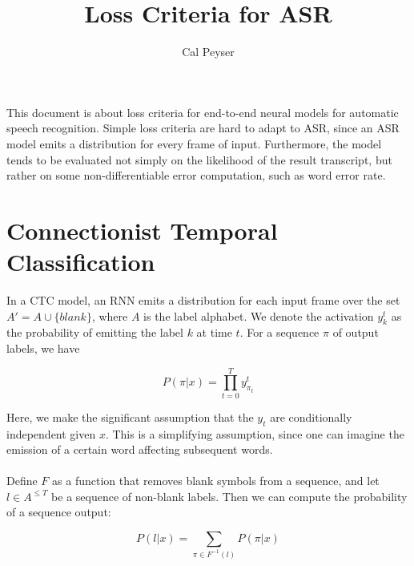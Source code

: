 \documentclass[12pt]{article}
\begin{document}
\title{Loss Criteria for ASR}
\author{Cal Peyser}
\maketitle

This document is about loss criteria for end-to-end neural models for automatic speech recognition.  Simple loss criteria are hard to adapt to ASR, since an ASR model emits a distribution for every frame of input.  Furthermore, the model tends to be evaluated not simply on the likelihood of the result transcript, but rather on some non-differentiable error computation, such as word error rate.

\section{Connectionist Temporal Classification}
In a CTC model, an RNN emits a distribution for each input frame over the set $A' = A \cup \{blank\}$, where $A$ is the label alphabet.  We denote the activation $y^t_k$ as the probability of emitting the label $k$ at time $t$.  For a sequence $\pi$ of output labels, we have

\[P(\pi | x) = \prod_{t = 0}^T y^t_{\pi_t}\]

Here, we make the significant assumption that the $y_t$ are conditionally independent given $x$.  This is a simplifying assumption, since one can imagine the emission of a certain word affecting subsequent words.
\\ \\
Define $F$ as a function that removes blank symbols from a sequence, and let $l \in A^{\le T}$ be a sequence of non-blank labels.  Then we can compute the probability of a sequence output:

\[P(l|x) = \sum_{\pi \in F^{-1}(l)} P(\pi | x)\]
 
\end{document}

